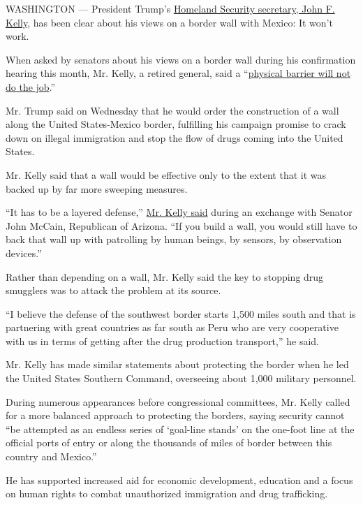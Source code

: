 WASHINGTON --- President Trump's
\href{https://www.nytimes.com/2017/01/20/us/politics/trump-cabinet-confirmation-mattis-kelly.html}{Homeland
Security secretary, John F. Kelly}, has been clear about his views on a
border wall with Mexico: It won't work.

When asked by senators about his views on a border wall during his
confirmation hearing this month, Mr. Kelly, a retired general, said a
``\href{http://liveblog.abcnews.go.com/Event/Trump_Cabinet_Senate_Confirmation_Hearings/611037300}{physical
barrier will not do the job}.''

Mr. Trump said on Wednesday that he would order the construction of a
wall along the United States-Mexico border, fulfilling his campaign
promise to crack down on illegal immigration and stop the flow of drugs
coming into the United States.

Mr. Kelly said that a wall would be effective only to the extent that it
was backed up by far more sweeping measures.

``It has to be a layered defense,''
\href{https://www.c-span.org/video/?421234-1/homeland-security-nominee-general-john-kelly-testifies-confirmation-hearing}{Mr.
Kelly said} during an exchange with Senator John McCain, Republican of
Arizona. ``If you build a wall, you would still have to back that wall
up with patrolling by human beings, by sensors, by observation
devices.''

Rather than depending on a wall, Mr. Kelly said the key to stopping drug
smugglers was to attack the problem at its source.

``I believe the defense of the southwest border starts 1,500 miles south
and that is partnering with great countries as far south as Peru who are
very cooperative with us in terms of getting after the drug production
transport,'' he said.

Mr. Kelly has made similar statements about protecting the border when
he led the United States Southern Command, overseeing about 1,000
military personnel.

During numerous appearances before congressional committees, Mr. Kelly
called for a more balanced approach to protecting the borders, saying
security cannot ``be attempted as an endless series of `goal-line
stands' on the one-foot line at the official ports of entry or along the
thousands of miles of border between this country and Mexico.''

He has supported increased aid for economic development, education and a
focus on human rights to combat unauthorized immigration and drug
trafficking.

